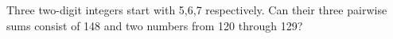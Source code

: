 Three two-digit integers start with 5,6,7 respectively. Can their three pairwise sums consist of 148 and two numbers from 120 through 129?
